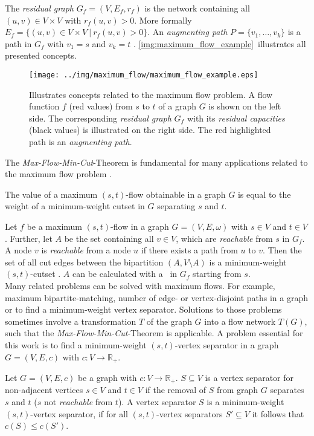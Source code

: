 The \emph{residual graph} $G_f = (V,E_f,r_f)$ is the network containing all $(u,v) \in V \times V$
with $r_f(u,v) > 0$. More formally $E_f = \{(u,v) \in V \times V\ |\ r_f(u,v) > 0\}$.
An \emph{augmenting path} $P = \{v_1,\ldots,v_k\}$ is a path in $G_f$ with $v_1 = s$ and 
$v_k = t$ \cite{edmonds1972theoretical}. \autoref{img:maximum_flow_example}~illustrates 
all presented concepts. \\
\begin{figure}
\centering
\texttt{[image: ../img/maximum\_flow/maximum\_flow\_example.eps]}
\caption{Illustrates concepts related to the maximum flow problem. A flow function $f$ 
(red values) from $s$ to $t$ of a graph $G$ is shown on the left side. The corresponding
\emph{residual graph} $G_f$ with its \emph{residual capacities} (black values) 
is illustrated on the right side. The red highlighted path is an \emph{augmenting path}.}
\label{img:maximum_flow_example}
\end{figure}
The \emph{Max-Flow-Min-Cut}-Theorem is fundamental for many applications related to the maximum
flow problem \cite{ford1956maximal}.

\begin{theorem}
The value of a maximum $(s,t)$-flow obtainable in a graph $G$ is equal to the 
weight of a minimum-weight cutset in $G$ separating $s$ and $t$.
\end{theorem}

Let $f$ be a maximum $(s,t)$-flow in a graph $G = (V,E,\omega)$ with $s \in V$ and $t \in V$. 
Further, let $A$ be the set containing all $v \in V$, which are \emph{reachable} from $s$
in $G_f$. A node $v$ is \emph{reachable} from a node $u$ if there exists a path from $u$
to $v$. Then the set of all cut edges between the bipartition $(A,V\setminus A)$ 
is a minimum-weight $(s,t)$-cutset \cite{ford2015flows}. $A$ can be calculated with a \BFS~in $G_f$ starting
from $s$. \\ 
Many related problems can be solved with maximum flows. For example, maximum bipartite-matching,
number of edge- or vertex-disjoint paths in a graph or to find a minimum-weight vertex
separator. Solutions to those problems sometimes involve a transformation $T$ of the graph $G$
into a flow network $T(G)$, such that the \emph{Max-Flow-Min-Cut}-Theorem is applicable. 
A problem essential for this work is to find a minimum-weight $(s,t)$-vertex separator
in a graph $G = (V,E,c)$ with $c: V \rightarrow \mathbb{R}_+$.

\begin{definition}
Let $G = (V,E,c)$ be a graph with $c: V \rightarrow \mathbb{R}_+$. $S \subseteq V$
is a vertex separator for non-adjacent vertices $s \in V$ and $t \in V$ if the
removal of $S$ from graph $G$ separates $s$ and $t$ ($s$ not \emph{reachable} from $t$).
A vertex separator $S$ is a minimum-weight $(s,t)$-vertex separator, if for all 
$(s,t)$-vertex separators $S' \subseteq V$ it follows that $c(S) \le c(S')$.
\end{definition}

